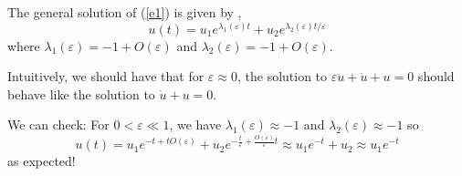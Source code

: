 \documentclass[12pt]{article}
\newcommand{\ep}{\varepsilon}
\begin{document}
\begin{enumerate}[(i)]
          \color{blue}
          The general solution of (\ref{e1}) is given by ,
          \[u(t) = u_1 e^{\lambda_1(\ep)t} + u_2 e^{\lambda_2(\ep)t/\ep} \]
          where $\lambda_1(\ep) = -1 + O(\ep)$ and $\lambda_2(\ep) = -1 + O(\ep)$.

          Intuitively, we should have that for $\ep \approx 0$, the solution to $\ep\ddot u + \dot u + u =0$ should behave like the solution to $\dot u + u = 0$.

          We can check: For $0< \ep \ll 1$, we have $\lambda_1(\ep) \approx -1$ and $\lambda_2(\ep) \approx -1$ so
          \[u(t) = u_1 e^{-t + tO(\ep)} + u_2e^{-\frac{t}{\ep} + \frac{O(\ep)}{\ep} t} \approx u_1e^{-t} + u_2 \approx u_1e^{-t}\]
          as expected!
          \color{black}

\end{enumerate}

\end{document}
